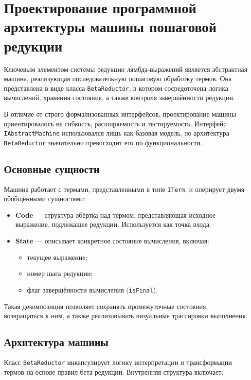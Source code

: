 \section{Проектирование программной архитектуры машины пошаговой редукции}
\label{sec:beta-reductor-api}

Ключевым элементом системы редукции лямбда‑выражений является абстрактная машина, реализующая последовательную пошаговую обработку термов. Она представлена в виде класса \texttt{BetaReductor}, в котором сосредоточена логика вычислений, хранения состояния, а также контроля завершённости редукции.

В отличие от строго формализованных интерфейсов, проектирование машины ориентировалось на гибкость, расширяемость и тестируемость. Интерфейс \texttt{IAbstractMachine} использовался лишь как базовая модель, но архитектура \texttt{BetaReductor} значительно превосходит его по функциональности.

\subsection{Основные сущности}

Машина работает с термами, представленными в типе \texttt{ITerm}, и оперирует двумя обобщёнными сущностями:

\begin{itemize}
  \item \textbf{Code} — структура-обёртка над термом, представляющая исходное выражение, подлежащее редукции. Используется как точка входа.
  \item \textbf{State} — описывает конкретное состояние вычисления, включая:
    \begin{itemize}
      \item текущее выражение;
      \item номер шага редукции;
      \item флаг завершённости вычисления (\texttt{isFinal}).
    \end{itemize}
\end{itemize}

Такая декомпозиция позволяет сохранять промежуточные состояния, возвращаться к ним, а также реализовывать визуальные трассировки выполнения.

\subsection{Архитектура машины}

Класс \texttt{BetaReductor} инкапсулирует логику интерпретации и трансформации термов на основе правил бета-редукции. Внутренняя структура включает:


